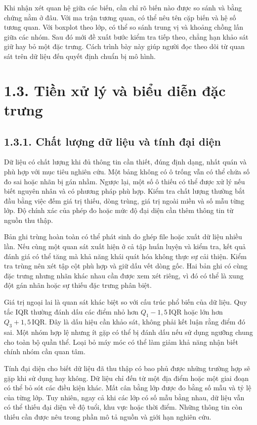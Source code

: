 Khi nhận xét quan hệ giữa các biến, cần chỉ rõ biến nào được so sánh và bằng chứng nằm ở đâu. Với ma trận tương quan, có thể nêu tên cặp biến và hệ số tương quan. Với boxplot theo lớp, có thể so sánh trung vị và khoảng chồng lấn giữa các nhóm. Sau đó mới đề xuất bước kiểm tra tiếp theo, chẳng hạn khảo sát giữ hay bỏ một đặc trưng. Cách trình bày này giúp người đọc theo dõi từ quan sát trên dữ liệu đến quyết định chuẩn bị mô hình.


\section{1.3. Tiền xử lý và biểu diễn đặc trưng}

\subsection{1.3.1. Chất lượng dữ liệu và tính đại diện}

Dữ liệu có chất lượng khi đủ thông tin cần thiết, đúng định dạng, nhất quán và phù hợp với mục tiêu nghiên cứu. Một bảng không có ô trống vẫn có thể chứa số đo sai hoặc nhãn bị gán nhầm. Ngược lại, một số ô thiếu có thể được xử lý nếu biết nguyên nhân và có phương pháp phù hợp. Kiểm tra chất lượng thường bắt đầu bằng việc đếm giá trị thiếu, dòng trùng, giá trị ngoài miền và số mẫu từng lớp. Độ chính xác của phép đo hoặc mức độ đại diện cần thêm thông tin từ nguồn thu thập.


Bản ghi trùng hoàn toàn có thể phát sinh do ghép file hoặc xuất dữ liệu nhiều lần. Nếu cùng một quan sát xuất hiện ở cả tập huấn luyện và kiểm tra, kết quả đánh giá có thể tăng mà khả năng khái quát hóa không thực sự cải thiện. Kiểm tra trùng nên xét tập cột phù hợp và giữ dấu vết dòng gốc. Hai bản ghi có cùng đặc trưng nhưng nhãn khác nhau cần được xem xét riêng, vì đó có thể là xung đột gán nhãn hoặc sự thiếu đặc trưng phân biệt.


Giá trị ngoại lai là quan sát khác biệt so với cấu trúc phổ biến của dữ liệu. Quy tắc IQR thường đánh dấu các điểm nhỏ hơn \(Q_1-1{,}5\,\mathrm{IQR}\) hoặc lớn hơn \(Q_3+1{,}5\,\mathrm{IQR}\). Đây là dấu hiệu cần khảo sát, không phải kết luận rằng điểm đó sai. Một nhóm hợp lệ nhưng ít gặp có thể bị đánh dấu nếu sử dụng ngưỡng chung cho toàn bộ quần thể. Loại bỏ máy móc có thể làm giảm khả năng nhận biết chính nhóm cần quan tâm.


Tính đại diện cho biết dữ liệu đã thu thập có bao phủ được những trường hợp sẽ gặp khi sử dụng hay không. Dữ liệu chỉ đến từ một địa điểm hoặc một giai đoạn có thể bỏ sót các điều kiện khác. Mất cân bằng lớp được đo bằng số mẫu và tỷ lệ của từng lớp. Tuy nhiên, ngay cả khi các lớp có số mẫu bằng nhau, dữ liệu vẫn có thể thiếu đại diện về độ tuổi, khu vực hoặc thời điểm. Những thông tin còn thiếu cần được nêu trong phần mô tả nguồn và giới hạn nghiên cứu.


